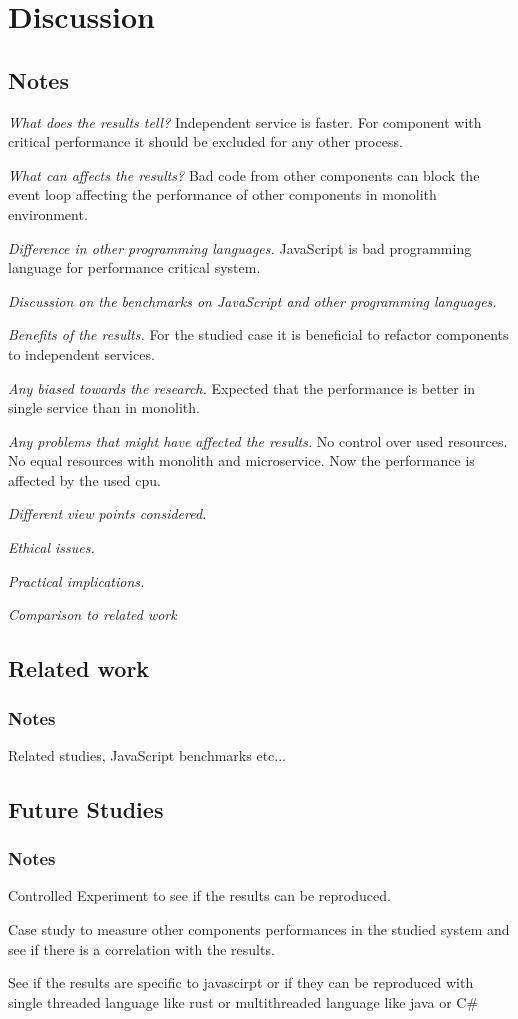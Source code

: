 \chapter{Discussion\label{discussion}}
\section{Notes}
\textit{What does the results tell?}
Independent service is faster.
For component with critical performance it should be excluded for any other process.

\textit{What can affects the results?}
Bad code from other components can block the event loop affecting the performance of other components in monolith environment.

\textit{Difference in other programming languages.}
JavaScript is bad programming language for performance critical system.

\textit{Discussion on the benchmarks on JavaScript and other programming languages.}

\textit{Benefits of the results.}
For the studied case it is beneficial to refactor components to independent services.

\textit{Any biased towards the research.}
Expected that the performance is better in single service than in monolith.

\textit{Any problems that might have affected the results.}
No control over used resources. No equal resources with monolith and microservice. Now the performance is affected by the used cpu.

\textit{Different view points considered.}

\textit{Ethical issues.}

\textit{Practical implications.}

\textit{Comparison to related work}


\section{Related work}
\subsection{Notes}
Related studies, JavaScript benchmarks etc...

\section{Future Studies}
\subsection{Notes}
Controlled Experiment to see if the results can be reproduced.

Case study to measure other components performances in the studied system and see if there is a correlation with the results.

See if the results are specific to javascirpt or if they can be reproduced with single threaded language like rust or multithreaded language like java or C\#
